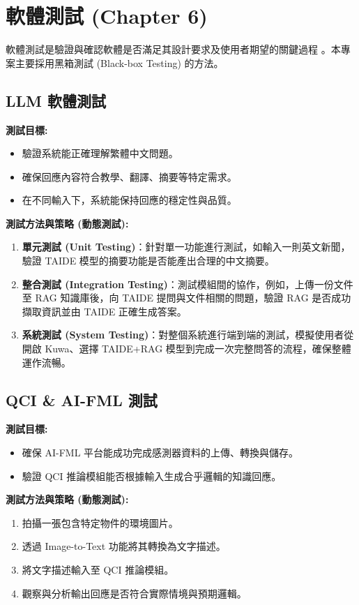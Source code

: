 \documentclass[twocolumn,11pt,a4paper]{article}
\begin{document}
\section{軟體測試 (Chapter 6)}
軟體測試是驗證與確認軟體是否滿足其設計要求及使用者期望的關鍵過程 \cite{lee2024se}。本專案主要採用黑箱測試 (Black-box Testing) 的方法。

\subsection{LLM 軟體測試}
\textbf{測試目標:}
\begin{itemize}
    \item 驗證系統能正確理解繁體中文問題。
    \item 確保回應內容符合教學、翻譯、摘要等特定需求。
    \item 在不同輸入下，系統能保持回應的穩定性與品質。
\end{itemize}
\textbf{測試方法與策略 (動態測試):}
\begin{enumerate}
    \item \textbf{單元測試 (Unit Testing)}：針對單一功能進行測試，如輸入一則英文新聞，驗證 TAIDE 模型的摘要功能是否能產出合理的中文摘要。
    \item \textbf{整合測試 (Integration Testing)}：測試模組間的協作，例如，上傳一份文件至 RAG 知識庫後，向 TAIDE 提問與文件相關的問題，驗證 RAG 是否成功擷取資訊並由 TAIDE 正確生成答案。
    \item \textbf{系統測試 (System Testing)}：對整個系統進行端到端的測試，模擬使用者從開啟 Kuwa、選擇 TAIDE+RAG 模型到完成一次完整問答的流程，確保整體運作流暢。
\end{enumerate}

\subsection{QCI \& AI-FML 測試}
\textbf{測試目標:}
\begin{itemize}
    \item 確保 AI-FML 平台能成功完成感測器資料的上傳、轉換與儲存。
    \item 驗證 QCI 推論模組能否根據輸入生成合乎邏輯的知識回應。
\end{itemize}
\textbf{測試方法與策略 (動態測試):}
\begin{enumerate}
    \item 拍攝一張包含特定物件的環境圖片。
    \item 透過 Image-to-Text 功能將其轉換為文字描述。
    \item 將文字描述輸入至 QCI 推論模組。
    \item 觀察與分析輸出回應是否符合實際情境與預期邏輯。
\end{enumerate}
\end{document}
